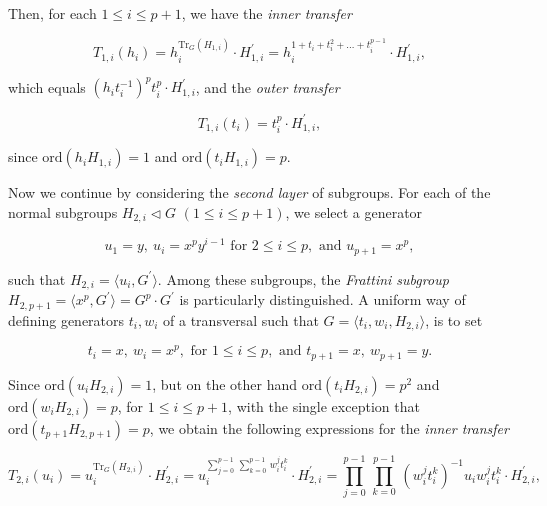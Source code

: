 \documentclass{amsart}
\theoremstyle{definition}
\numberwithin{equation}{section}
\begin{document}
\noindent
Then, for each \(1\le i\le p+1\), we have the \textit{inner transfer}

\begin{equation}
\label{eqn:InnerATLyr1P2xP}
T_{1,i}(h_i)=h_i^{\mathrm{Tr}_G(H_{1,i})}\cdot H_{1,i}^\prime=h_i^{1+t_i+t_i^2+\ldots +t_i^{p-1}}\cdot H_{1,i}^\prime,
\end{equation}

\noindent
which equals \((h_it_i^{-1})^pt_i^p\cdot H_{1,i}^\prime\), and the \textit{outer transfer}

\begin{equation}
\label{eqn:OuterATLyr1P2xP}
T_{1,i}(t_i)=t_i^p\cdot H_{1,i}^\prime,
\end{equation}

\noindent
since \(\mathrm{ord}(h_iH_{1,i})=1\) and \(\mathrm{ord}(t_iH_{1,i})=p\).

Now we continue by considering the \textit{second layer} of subgroups.
For each of the normal subgroups \(H_{2,i}\triangleleft G\) \((1\le i\le p+1)\),
we select a generator

\begin{equation}
\label{eqn:GenLyr2P2xP}
u_1=y,\ u_i=x^py^{i-1} \text{ for } 2\le i\le p, \text{ and } u_{p+1}=x^p,
\end{equation}

\noindent
such that \(H_{2,i}=\langle u_i,G^\prime\rangle\).
Among these subgroups, the \textit{Frattini subgroup} \(H_{2,p+1}=\langle x^p,G^\prime\rangle=G^p\cdot G^\prime\)
is particularly distinguished.
A uniform way of defining generators \(t_i,w_i\) of a transversal such that \(G=\langle t_i,w_i,H_{2,i}\rangle\),
is to set

\begin{equation}
\label{eqn:TrvLyr2P2xP}
t_i=x,\ w_i=x^p,\text{ for } 1\le i\le p, \text{ and } t_{p+1}=x,\ w_{p+1}=y.
\end{equation}

\noindent
Since \(\mathrm{ord}(u_iH_{2,i})=1\), but on the other hand \(\mathrm{ord}(t_iH_{2,i})=p^2\) and \(\mathrm{ord}(w_iH_{2,i})=p\),
for \(1\le i\le p+1\),
with the single exception that \(\mathrm{ord}(t_{p+1}H_{2,p+1})=p\),
we obtain the following expressions for the \textit{inner transfer}

\begin{equation}
\label{eqn:InnerATLyr2P2xP}
T_{2,i}(u_i)=u_i^{\mathrm{Tr}_G(H_{2,i})}\cdot H_{2,i}^\prime=u_i^{\sum_{j=0}^{p-1}\,\sum_{k=0}^{p-1}\,w_i^jt_i^k}\cdot H_{2,i}^\prime
=\prod_{j=0}^{p-1}\,\prod_{k=0}^{p-1}\,(w_i^jt_i^k)^{-1}u_iw_i^jt_i^k\cdot H_{2,i}^\prime,
\end{equation}
\end{document}
